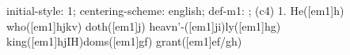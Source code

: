 initial-style: 1;
centering-scheme: english;
def-m1: \grealign;
(c4) 1. He([em1]h) who([em1]hjkv) doth([em1]j) heavn'-([em1]ji)ly([em1]hg) king([em1]hjIH)doms([em1]gf) grant([em1]ef/gh)